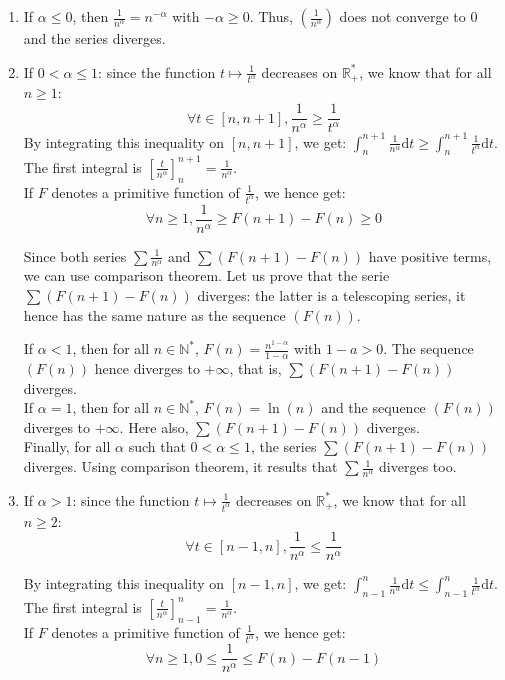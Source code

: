 \documentclass[notitlepage]{math}
\begin{document}
\begin{enumerate}
    \item If $\alpha \leq 0$, then $\frac{1}{n^\alpha} = n^{-\alpha}$ with $-\alpha \geq 0$. Thus,  $\left(\frac{1}{n^\alpha}\right)$ does not converge to $0$ and the series diverges.
    \item If $0 < \alpha \leq 1$: since the function $t \mapsto \frac{1}{t^\alpha}$ decreases on $\mathbb{R}^*_+$, we know that for all $n \geq 1$:
    \[ \forall t \in [n, n+1], \frac{1}{n^\alpha} \geq \frac{1}{t^\alpha} \]
    By integrating this inequality on $[n, n+1]$, we get: $\int_n^{n+1} \frac{1}{n^\alpha} \mathrm{d}t \geq \int_n^{n+1} \frac{1}{t^\alpha} \mathrm{d}t$.\\[0.5em]
    The first integral is $\left[\frac{t}{n^\alpha}\right]_n^{n+1} = \frac{1}{n^\alpha}$.\\[1em]
    If $F$ denotes a primitive function of $\frac{1}{t^\alpha}$, we hence get:
    \[ \forall n \geq 1, \frac{1}{n^\alpha} \geq F(n+1) - F(n) \geq 0 \]

    Since both series $\sum \frac{1}{n^\alpha}$ and $\sum \left(F(n+1) - F(n)\right)$ have positive terms, we can use comparison theorem. 
    Let us prove that the serie $\sum \left(F(n+1) - F(n)\right)$ diverges: the latter is a telescoping series, it hence has the same nature as the sequence $(F(n))$.

    If $\alpha < 1$, then for all $n \in \mathbb{N}^*$, $F(n) = \frac{n^{1-\alpha}}{1-\alpha}$ with $1-a > 0$. The sequence $(F(n))$ hence diverges to $+\infty$, that is, $\sum \left(F(n+1) - F(n)\right)$ diverges.\\[0.5em]

    If $\alpha = 1$, then for all $n \in \mathbb{N}^*$, $F(n) = \ln(n)$ and the sequence $(F(n))$ diverges to $+\infty$. Here also, $\sum \left(F(n+1) - F(n)\right)$ diverges.\\[0.5em]
    
    Finally, for all $\alpha$ such that $0 < \alpha \leq 1$, the series $\sum \left(F(n+1) - F(n)\right)$ diverges. Using comparison theorem, it results that $\sum \frac{1}{n^\alpha}$ diverges too.

    \item If $\alpha > 1$: since the function $t \mapsto \frac{1}{t^\alpha}$ decreases on $\mathbb{R}^*_+$, we know that for all $n \geq 2$:
    \[ \forall t \in [n-1, n], \frac{1}{n^\alpha} \leq \frac{1}{n^\alpha} \]

    By integrating this inequality on $[n-1, n]$, we get: $\int_{n-1}^n \frac{1}{n^\alpha} \mathrm{d}t \leq \int_{n-1}^n \frac{1}{t^\alpha} \mathrm{d}t$.\\[0.5em]
    The first integral is $\left[\frac{t}{n^\alpha}\right]_{n-1}^n = \frac{1}{n^\alpha}$.\\[1em]
    If $F$ denotes a primitive function of $\frac{1}{t^\alpha}$, we hence get:
    \[ \forall n \geq 1, 0 \leq \frac{1}{n^\alpha} \leq F(n) - F(n-1) \]


\end{enumerate}
\end{document}
